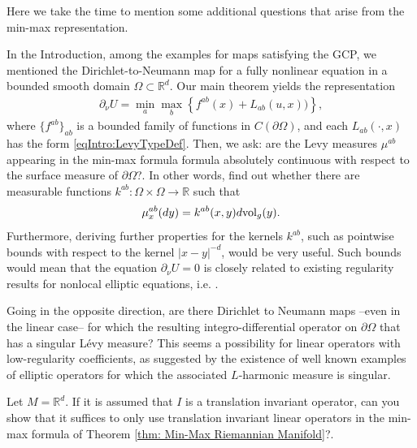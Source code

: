 \documentclass[11pt,reqno]{amsart}
\numberwithin{equation}{section}
\theoremstyle{plain}
\def\Om{\Omega}
\begin{document}
Here we take the time to mention some additional questions that arise from the min-max representation.   
\begin{question}
  In the Introduction, among the examples for maps satisfying the GCP, we mentioned the Dirichlet-to-Neumann map for a fully nonlinear equation in a bounded smooth domain $\Omega \subset \mathbb{R}^d$. Our main theorem yields the representation
  \begin{align*}
    \partial_\nu U = \min\limits_{a}\max \limits_{b} \left \{ f^{ab}(x)+L_{ab}(u,x) )  \right \},
  \end{align*}
  where $\{f^{ab}\}_{ab}$ is a bounded family of functions in $C(\partial \Omega)$, and each $L_{ab}(\cdot,x)$ has the form \eqref{eqIntro:LevyTypeDef}. Then, we ask: are the Levy measures $\mu^{ab}$ appearing in the min-max formula formula absolutely continuous with respect to the surface measure of $\partial \Omega$?. In other words, find out whether there are measurable functions $k^{ab}: \Omega \times \Omega \to \mathbb{R}$ such that
  \begin{align*}
    \mu^{ab}_x(dy) = k^{ab}(x,y)d\textnormal{vol}_g(y).
  \end{align*}
  Furthermore, deriving further properties for the kernels $k^{ab}$, such as pointwise bounds with respect to the  kernel $|x-y|^{-d}$, would be very useful. Such bounds would mean that the equation $\partial_\nu U=0$ is closely related to existing regularity results for nonlocal elliptic equations, i.e. \cite{BaLe-2002TransitionProb,CaSi-09RegularityIntegroDiff,ChDa-2012NonsymKernels,SchwabSilvestre-2014RegularityIntDiffVeryIrregKernelsAPDE}.
\end{question}


\begin{question}
  Going in the opposite direction, are there Dirichlet to Neumann maps --even in the linear case-- for which the resulting integro-differential operator on $\partial\Om$ that has a singular L\'evy measure?  This seems a possibility for linear operators with low-regularity coefficients, as suggested by the existence of well known examples of elliptic operators for which the associated $L$-harmonic measure is singular.
\end{question}





\begin{question}
  Let $M=\mathbb{R}^d$. If it is assumed that $I$ is a translation invariant operator, can you show that it suffices to only use translation invariant linear operators in the min-max formula of Theorem \ref{thm: Min-Max Riemannian Manifold}?.
\end{question}
\end{document}
